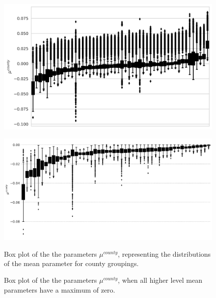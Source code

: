 \documentclass[a4paper]{article}
\begin{document}


\begin{figure}
\begin{minipage}{.45\textwidth}
  \centering
  \includegraphics[width=1\linewidth]{figures/BayCountyPlot.png}
	\label{fig:BayCountyPlot}
 \end{minipage}\qquad
\begin{minipage}{.45\textwidth}
  \centering
  \includegraphics[width=1\linewidth]{figures/BayCountyPlot_const.png}
  \label{fig:BayCountyPlot_const}
 \end{minipage}

\bigskip

\begin{minipage}[t]{.45\textwidth}
\centering
  \caption{Box plot of the the parameters $\mu^{county}$, representing the distributions of the mean parameter for county groupings.}
\end{minipage}\qquad
\begin{minipage}[t]{.45\textwidth}
\centering
  \caption{Box plot of the the parameters $\mu^{county}$, when all higher level mean parameters have a maximum of zero.}
\end{minipage}
\end{figure}
\end{document}
